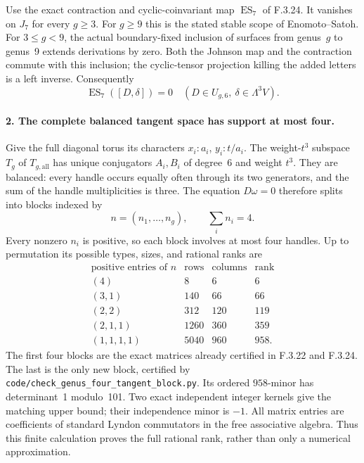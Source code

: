 Use the exact contraction and cyclic-coinvariant
map $\operatorname{ES}_7$ of F.3.24. It vanishes on
$J_7$ for every $g\geq3$. For $g\geq9$ this is
the stated stable scope of Enomoto--Satoh. For
$3\leq g<9$, the actual boundary-fixed inclusion
of surfaces from genus~$g$ to genus~9 extends
derivations by zero. Both the Johnson map and
the contraction commute with this inclusion;
the cyclic-tensor projection killing the added
letters is a left inverse. Consequently
\[
     \operatorname{ES}_7([D,\delta])=0
      \quad(D\in U_{g,6},\ \delta\in\Lambda^3V).           \tag{AG.3}
\]

\paragraph{2. The complete balanced tangent space has support at most four.}
Give the full diagonal torus its characters
$x_i:a_i$, $y_i:t/a_i$. The weight-$t^3$ subspace
$T_g$ of $T_{g,\mathrm{all}}$ has unique conjugators
$A_i,B_i$ of degree~6 and weight $t^3$. They are
balanced: every handle occurs equally often through
its two generators, and the sum of the handle
multiplicities is three. The equation $D\omega=0$
therefore splits into blocks indexed by
\[
               n=(n_1,\ldots,n_g),\qquad \sum_i n_i=4.
\]
Every nonzero $n_i$ is positive, so each block involves
at most four handles. Up to permutation its possible
types, sizes, and rational ranks are
\[
\begin{array}{c|r|r|r}
\text{positive entries of }n&\text{rows}&\text{columns}&\text{rank}\\\hline
(4)&8&6&6\\
(3,1)&140&66&66\\
(2,2)&312&120&119\\
(2,1,1)&1260&360&359\\
(1,1,1,1)&5040&960&958.
\end{array}                                               \tag{AG.4}
\]
The first four blocks are the exact matrices already
certified in F.3.22 and F.3.24. The last is the only
new block, certified by
\texttt{code/check\_genus\_four\_tangent\_block.py}.
Its ordered $958$-minor has determinant~1 modulo~101.
Two exact independent integer kernels give the
matching upper bound; their independence minor is
$-1$. All matrix entries are coefficients of standard
Lyndon commutators in the free associative algebra.
Thus this finite calculation proves the full rational
rank, rather than only a numerical approximation.

